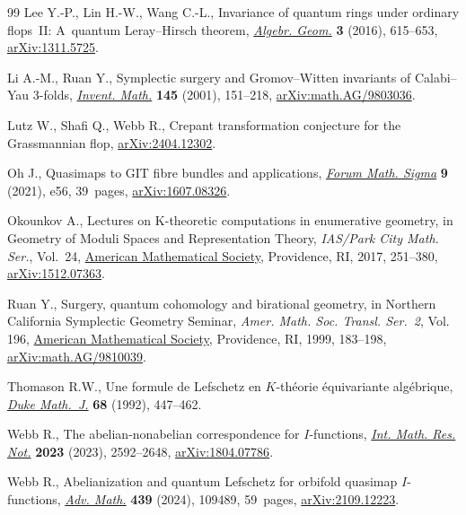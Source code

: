 \documentclass[pdftex]{sigma}
\numberwithin{equation}{section}
\begin{document}
\begin{thebibliography}{99}
Lee Y.-P., Lin H.-W., Wang C.-L., Invariance of quantum rings under ordinary
 flops~{II}: {A}~quantum {L}eray--{H}irsch theorem, \href{https://doi.org/10.14231/AG-2016-027}{\textit{Algebr. Geom.}}
 \textbf{3} (2016), 615--653, \href{https://arxiv.org/abs/1311.5725}{arXiv:1311.5725}.

Li A.-M., Ruan Y., Symplectic surgery and {G}romov--{W}itten invariants of
 {C}alabi--{Y}au 3-folds, \href{https://doi.org/10.1007/s002220100146}{\textit{Invent. Math.}} \textbf{145} (2001),
 151--218, \href{https://arxiv.org/abs/math.AG/9803036}{arXiv:math.AG/9803036}.

Lutz W., Shafi Q., Webb R., Crepant transformation conjecture for the
 {G}rassmannian flop, \href{https://arxiv.org/abs/2404.12302}{arXiv:2404.12302}.

Oh J., Quasimaps to {GIT} fibre bundles and applications, \href{https://doi.org/10.1017/fms.2021.48}{\textit{Forum Math.
 Sigma}} \textbf{9} (2021), e56, 39~pages, \href{https://arxiv.org/abs/1607.08326}{arXiv:1607.08326}.

Okounkov A., Lectures on {K}-theoretic computations in enumerative geometry, in
 Geometry of Moduli Spaces and Representation Theory, \textit{IAS/Park City
 Math. Ser.}, Vol.~24, \href{https://doi.org/10.1090/pcms/024}{American Mathematical Society}, Providence, RI, 2017,
 251--380, \href{https://arxiv.org/abs/1512.07363}{arXiv:1512.07363}.

Ruan Y., Surgery, quantum cohomology and birational geometry, in Northern
 {C}alifornia {S}ymplectic {G}eometry {S}eminar, \textit{Amer. Math. Soc.
 Transl. Ser.~2}, Vol. 196, \href{https://doi.org/10.1090/trans2/196/09}{American Mathematical Society}, Providence, RI,
 1999, 183--198, \href{https://arxiv.org/abs/math.AG/9810039}{arXiv:math.AG/9810039}.

Thomason R.W., Une formule de {L}efschetz en {$K$}-th\'eorie \'equivariante
 alg\'ebrique, \href{https://doi.org/10.1215/S0012-7094-92-06817-7}{\textit{Duke Math.~J.}} \textbf{68} (1992), 447--462.

Webb R., The abelian-nonabelian correspondence for {$I$}-functions,
 \href{https://doi.org/10.1093/imrn/rnab305}{\textit{Int. Math. Res. Not.}} \textbf{2023} (2023), 2592--2648,
 \href{https://arxiv.org/abs/1804.07786}{arXiv:1804.07786}.

Webb R., Abelianization and quantum {L}efschetz for orbifold quasimap
 {$I$}-functions, \href{https://doi.org/10.1016/j.aim.2024.109489}{\textit{Adv. Math.}} \textbf{439} (2024), 109489, 59~pages,
 \href{https://arxiv.org/abs/2109.12223}{arXiv:2109.12223}.

\end{thebibliography}\LastPageEnding
\end{document}
